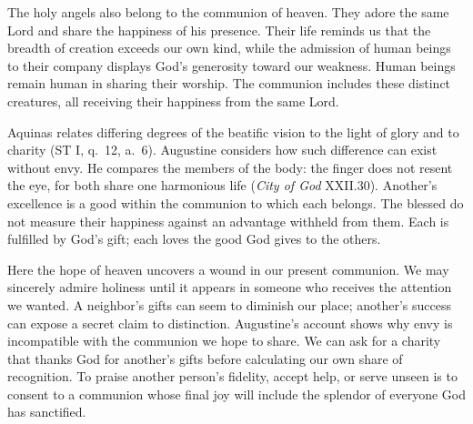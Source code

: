 The holy angels also belong to the communion of heaven. They adore the same Lord and share the happiness of his presence. Their life reminds us that the breadth of creation exceeds our own kind, while the admission of human beings to their company displays God's generosity toward our weakness. Human beings remain human in sharing their worship. The communion includes these distinct creatures, all receiving their happiness from the same Lord.

Aquinas relates differing degrees of the beatific vision to the light of glory and to charity (ST I, q.~12, a.~6). Augustine considers how such difference can exist without envy. He compares the members of the body: the finger does not resent the eye, for both share one harmonious life (\emph{City of God} XXII.30). Another's excellence is a good within the communion to which each belongs. The blessed do not measure their happiness against an advantage withheld from them. Each is fulfilled by God's gift; each loves the good God gives to the others.

Here the hope of heaven uncovers a wound in our present communion. We may sincerely admire holiness until it appears in someone who receives the attention we wanted. A neighbor's gifts can seem to diminish our place; another's success can expose a secret claim to distinction. Augustine's account shows why envy is incompatible with the communion we hope to share. We can ask for a charity that thanks God for another's gifts before calculating our own share of recognition. To praise another person's fidelity, accept help, or serve unseen is to consent to a communion whose final joy will include the splendor of everyone God has sanctified.

